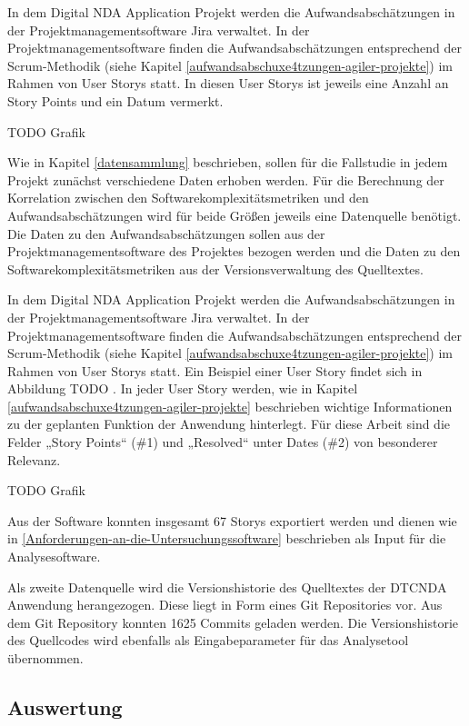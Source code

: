 In dem Digital \ac{NDA} Application Projekt werden die Aufwandsabschätzungen
in der Projektmanagementsoftware Jira verwaltet. In der
Projektmanagementsoftware finden die Aufwandsabschätzungen entsprechend
der Scrum-Methodik (siehe Kapitel \ref{aufwandsabschuxe4tzungen-agiler-projekte}) im Rahmen von User Storys statt.
In diesen User Storys ist jeweils eine Anzahl an Story Points und ein Datum vermerkt.

TODO Grafik

Wie in Kapitel \ref{datensammlung} beschrieben, sollen für die Fallstudie in jedem
Projekt zunächst verschiedene Daten erhoben werden. Für die Berechnung
der Korrelation zwischen den Softwarekomplexitätsmetriken und den
Aufwandsabschätzungen wird für beide Grö\ss en jeweils eine Datenquelle
benötigt. Die Daten zu den Aufwandsabschätzungen sollen aus der
Projektmanagementsoftware des Projektes bezogen werden und die Daten zu
den Softwarekomplexitätsmetriken aus der Versionsverwaltung des
Quelltextes.

In dem Digital \ac{NDA} Application Projekt werden die Aufwandsabschätzungen
in der Projektmanagementsoftware Jira verwaltet. In der
Projektmanagementsoftware finden die Aufwandsabschätzungen entsprechend
der Scrum-Methodik (siehe Kapitel \ref{aufwandsabschuxe4tzungen-agiler-projekte}) im Rahmen von User Storys statt.
Ein Beispiel einer User Story findet sich in Abbildung TODO . In
jeder User Story werden, wie in Kapitel \ref{aufwandsabschuxe4tzungen-agiler-projekte} beschrieben wichtige
Informationen zu der geplanten Funktion der Anwendung hinterlegt. Für
diese Arbeit sind die Felder „Story Points`` (\#1) und „Resolved`` unter
Dates (\#2) von besonderer Relevanz.

TODO Grafik

Aus der Software konnten insgesamt 67 Storys exportiert werden und
dienen wie in \ref{Anforderungen-an-die-Untersuchungssoftware} beschrieben als Input für die Analysesoftware.

Als zweite Datenquelle wird die Versionshistorie des Quelltextes der
DTCNDA Anwendung herangezogen. Diese liegt in Form eines Git
Repositories vor. Aus dem Git Repository konnten 1625 Commits geladen
werden. Die Versionshistorie des Quellcodes wird ebenfalls als
Eingabeparameter für das Analysetool übernommen.

\subsection{Auswertung}\label{nda-Auswertung}

